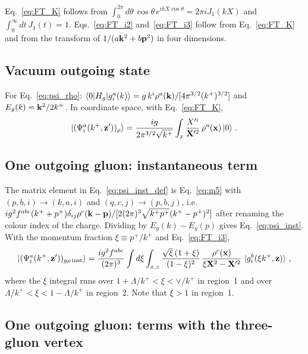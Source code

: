 Eq.~\eqref{eq:FT_K} follows from $\int_0^{2\pi}d\theta\,\cos\theta\,e^{ikX\cos\theta}=2\pi iJ_1(kX)$ and $\int_0^\infty dt\,J_1(t)=1$. Eqs.~\eqref{eq:FT_i2} and~\eqref{eq:FT_i3} follow from Eq.~\eqref{eq:FT_K} and from the transform of $1/(a\mathbf{k}^2+b\mathbf{p}^2)$ in four dimensions.


\subsection{Vacuum outgoing state}

For Eq.~\eqref{eq:psi_rho}: $\braket{0|H_g|g^a_i(k)}=g\,k^i\rho^a(\mathbf{k})/[4\pi^{3/2}(k^+)^{3/2}]$ and $E_g(k)=\mathbf{k}^2/2k^+$. In coordinate space, with Eq.~\eqref{eq:FT_K},
\begin{align}\label{eq:psi_rhoX}
\ket{(\Psi^a_i(k^+,\mathbf{z}'))_\rho}=\frac{ig}{2\pi^{3/2}\sqrt{k^+}}\int_x\frac{X'^i}{\mathbf{X}'^2}\,\rho^a(\mathbf{x})\ket0\,.
\end{align}

\subsection{One outgoing gluon: instantaneous term}

The matrix element in Eq.~\eqref{eq:psi_inst_def} is Eq.~\eqref{eq:m5} with $(p,b,i)\to(k,a,i)$ and $(q,c,j)\to(p,b,j)$, i.e.\ $ig^2f^{abc}(k^++p^+)\delta_{ij}\rho^c(\mathbf{k}-\mathbf{p})/[2(2\pi)^3\sqrt{k^+p^+}(k^+-p^+)^2]$ after renaming the colour index of the charge. Dividing by $E_g(k)-E_g(p)$ gives Eq.~\eqref{eq:psi_inst}. With the momentum fraction $\xi\equiv p^+/k^+$ and Eq.~\eqref{eq:FT_i3},
\begin{align}\label{eq:psi_instX}
\ket{(\Psi^a_i(k^+,\mathbf{z}'))_{g\rho\,{\rm inst}}}=\frac{ig^2f^{abc}}{(2\pi)^3}\int d\xi\int_{x,z}\frac{\sqrt\xi\,(1+\xi)}{(1-\xi)^2}\,\frac{\rho^c(\mathbf{x})}{\xi\mathbf{X}^2-\mathbf{X}'^2}\,\ket{g^b_i(\xi k^+,\mathbf{z})}\,,
\end{align}
where the $\xi$ integral runs over $1+\Lambda/k^+<\xi<\vee/k^+$ in region~1 and over $\Lambda/k^+<\xi<1-\Lambda/k^+$ in region~2. Note that $\xi>1$ in region~1.


\subsection{One outgoing gluon: terms with the three-gluon vertex}

